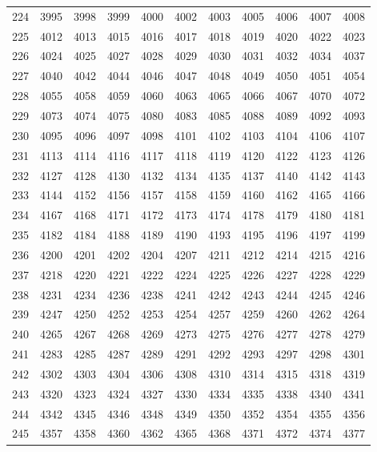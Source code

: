 \begin{longtable}{|r|rrrrrrrrrr|}
  224 & 3995 & 3998 & 3999 & 4000 & 4002 & 4003 & 4005 & 4006 & 4007 & 4008 \\ 
  225 & 4012 & 4013 & 4015 & 4016 & 4017 & 4018 & 4019 & 4020 & 4022 & 4023 \\ 
  226 & 4024 & 4025 & 4027 & 4028 & 4029 & 4030 & 4031 & 4032 & 4034 & 4037 \\ 
  227 & 4040 & 4042 & 4044 & 4046 & 4047 & 4048 & 4049 & 4050 & 4051 & 4054 \\ 
  228 & 4055 & 4058 & 4059 & 4060 & 4063 & 4065 & 4066 & 4067 & 4070 & 4072 \\ 
  229 & 4073 & 4074 & 4075 & 4080 & 4083 & 4085 & 4088 & 4089 & 4092 & 4093 \\ 
  230 & 4095 & 4096 & 4097 & 4098 & 4101 & 4102 & 4103 & 4104 & 4106 & 4107 \\ 
  231 & 4113 & 4114 & 4116 & 4117 & 4118 & 4119 & 4120 & 4122 & 4123 & 4126 \\ 
  232 & 4127 & 4128 & 4130 & 4132 & 4134 & 4135 & 4137 & 4140 & 4142 & 4143 \\ 
  233 & 4144 & 4152 & 4156 & 4157 & 4158 & 4159 & 4160 & 4162 & 4165 & 4166 \\ 
  234 & 4167 & 4168 & 4171 & 4172 & 4173 & 4174 & 4178 & 4179 & 4180 & 4181 \\ 
  235 & 4182 & 4184 & 4188 & 4189 & 4190 & 4193 & 4195 & 4196 & 4197 & 4199 \\ 
  236 & 4200 & 4201 & 4202 & 4204 & 4207 & 4211 & 4212 & 4214 & 4215 & 4216 \\ 
  237 & 4218 & 4220 & 4221 & 4222 & 4224 & 4225 & 4226 & 4227 & 4228 & 4229 \\ 
  238 & 4231 & 4234 & 4236 & 4238 & 4241 & 4242 & 4243 & 4244 & 4245 & 4246 \\ 
  239 & 4247 & 4250 & 4252 & 4253 & 4254 & 4257 & 4259 & 4260 & 4262 & 4264 \\ 
  240 & 4265 & 4267 & 4268 & 4269 & 4273 & 4275 & 4276 & 4277 & 4278 & 4279 \\ 
  241 & 4283 & 4285 & 4287 & 4289 & 4291 & 4292 & 4293 & 4297 & 4298 & 4301 \\ 
  242 & 4302 & 4303 & 4304 & 4306 & 4308 & 4310 & 4314 & 4315 & 4318 & 4319 \\ 
  243 & 4320 & 4323 & 4324 & 4327 & 4330 & 4334 & 4335 & 4338 & 4340 & 4341 \\ 
  244 & 4342 & 4345 & 4346 & 4348 & 4349 & 4350 & 4352 & 4354 & 4355 & 4356 \\ 
  245 & 4357 & 4358 & 4360 & 4362 & 4365 & 4368 & 4371 & 4372 & 4374 & 4377 \\ 

\end{longtable}
